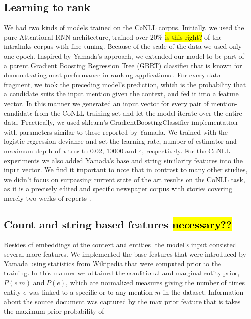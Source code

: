 \documentclass[11pt]{article}
\begin{document}
	\subsection{Learning to rank}
	We had two kinds of models trained on the CoNLL corpus. Initially, we used the pure Attentional RNN architecture, trained over $20$\% \hl{is this right?} of the intralinks corpus with fine-tuning. Because of the scale of the data we used only one epoch.
	Inspired by Yamada's approach, we extended our model to be part of a parent Gradient Boosting Regression Tree (GBRT) classifier that is known for demonstrating neat performance in ranking applications \cite{friedman2001greedy}. For every data fragment, we took the preceding model's prediction, which is the probability that a candidate suits the input mention given the context, and fed it into a feature vector. In this manner we generated an input vector for every pair of mention-candidate from the CoNLL training set and let the model iterate over the entire data. Practically, we used sklearn's GradientBoostingClassifier implementation \cite{pedregosa2011scikit} with parameters similar to those reported by Yamada. We trained with the logistic-regression deviance and set the learning rate, number of estimator and maximum depth of a tree to $0.02$, $10000$ and $4$, respectively. For the CoNLL experiments we also added Yamada's base and string similarity features into the input vector. 
	We find it important to note that in contrast to many other studies, we didn't focus on surpassing current state of the art results on the CoNLL task, as it is a precisely edited and specific newspaper corpus with stories covering merely two weeks of reports \cite{Sang2003}. 

	\subsection{Count and string based features \hl{necessary??}}
	Besides of embeddings of the context and entities' the model's input consisted several more features. We implemented the base features that were introduced by Yamada using statistics from Wikipedia that were computed prior to the training. In this manner we obtained the conditional and marginal entity prior, $P(e|m)$ and $P(e)$, which are normalized measures giving the number of times entity $e$ was linked to a specific or to any mention $m$ in the dataset. Information about the source document was captured by the max prior feature that is takes the maximum prior probability of 
	
\end{document}
